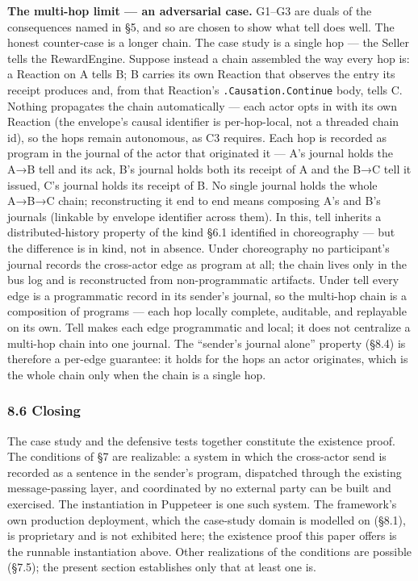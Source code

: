 \documentclass[
]{article}
\let\origtexttt\texttt%
\renewcommand{\texttt}[1]{\origtexttt{\seqsplit{#1}}}%
\let\texttt\origtexttt%
\begin{document}
\textbf{The multi-hop limit --- an adversarial case.} G1--G3 are duals
of the consequences named in §5, and so are chosen to show what tell
does well. The honest counter-case is a longer chain. The case study is
a single hop --- the Seller tells the RewardEngine. Suppose instead a
chain assembled the way every hop is: a Reaction on A tells B; B carries
its own Reaction that observes the entry its receipt produces and, from
that Reaction's \texttt{.Causation.Continue} body, tells C. Nothing
propagates the chain automatically --- each actor opts in with its own
Reaction (the envelope's causal identifier is per-hop-local, not a
threaded chain id), so the hops remain autonomous, as C3 requires. Each
hop is recorded as program in the journal of the actor that originated
it --- A's journal holds the A→B tell and its ack, B's journal holds
both its receipt of A and the B→C tell it issued, C's journal holds its
receipt of B. No single journal holds the whole A→B→C chain;
reconstructing it end to end means composing A's and B's journals
(linkable by envelope identifier across them). In this, tell inherits a
distributed-history property of the kind §6.1 identified in choreography
--- but the difference is in kind, not in absence. Under choreography no
participant's journal records the cross-actor edge as program at all;
the chain lives only in the bus log and is reconstructed from
non-programmatic artifacts. Under tell every edge is a programmatic
record in its sender's journal, so the multi-hop chain is a composition
of programs --- each hop locally complete, auditable, and replayable on
its own. Tell makes each edge programmatic and local; it does not
centralize a multi-hop chain into one journal. The ``sender's journal
alone'' property (§8.4) is therefore a per-edge guarantee: it holds for
the hops an actor originates, which is the whole chain only when the
chain is a single hop.

\subsubsection{8.6 Closing}\label{closing-4}

The case study and the defensive tests together constitute the existence
proof. The conditions of §7 are realizable: a system in which the
cross-actor send is recorded as a sentence in the sender's program,
dispatched through the existing message-passing layer, and coordinated
by no external party can be built and exercised. The instantiation in
Puppeteer is one such system. The framework's own production deployment,
which the case-study domain is modelled on (§8.1), is proprietary and is
not exhibited here; the existence proof this paper offers is the
runnable instantiation above. Other realizations of the conditions are
possible (§7.5); the present section establishes only that at least one
is.
\end{document}
